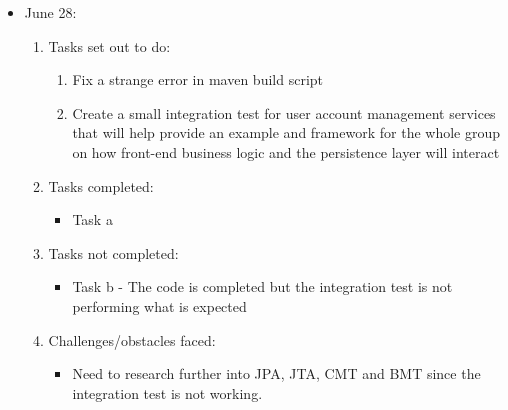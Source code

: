 	\begin{itemize}
		\item June 28:
		\begin{enumerate}
			\item Tasks set out to do:
			\begin{enumerate}
				\item Fix a strange error in maven build script
				\item Create a small integration test for user account management services that will help provide an example and framework for the whole group on how front-end business logic and the persistence layer will interact				
			\end{enumerate}
			\item Tasks completed:
			\begin{itemize}
				\item Task a								
			\end{itemize}
			\item Tasks not completed:
			\begin{itemize}
				\item Task b - The code is completed but the integration test is not performing what is expected
			\end{itemize}
			\item Challenges/obstacles faced:
			\begin{itemize}
				\item Need to research further into JPA, JTA, CMT and BMT since the integration test is not working.
			\end{itemize}			
		\end{enumerate}
	\end{itemize}
